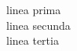 \documentclass{scrbook}
\begin{document}
\beginnumbering
\pstart
\begin{edtabularl}
linea prima \\
linea secunda \\
linea tertia 
\end{edtabularl}
\pend
\endnumbering
\end{document}
